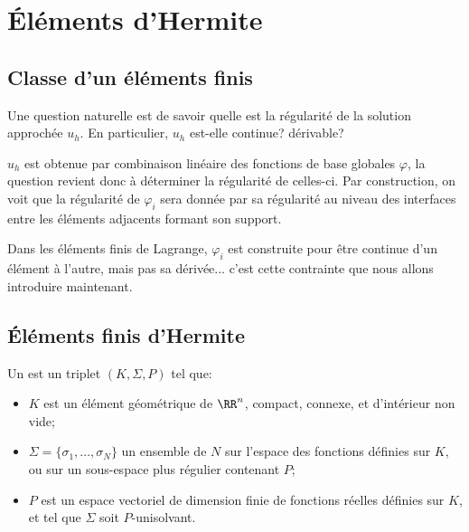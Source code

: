 \medskip
\section{Éléments d'Hermite}

\medskip
\subsection{Classe d'un éléments finis}

Une question naturelle est de savoir quelle est la régularité de la solution approchée
$u_h$. En particulier, $u_h$ est-elle continue? dérivable?

$u_h$ est obtenue par combinaison linéaire des fonctions de base globales
$\varphi$, la question revient donc à déterminer la régularité de celles-ci.
Par construction, on voit que la régularité de $\varphi_i$ sera donnée par sa
régularité au niveau des interfaces entre les éléments adjacents formant
son support.

Dans les éléments finis de Lagrange, $\varphi_i$ est construite pour être continue
d'un élément à l'autre, mais pas sa dérivée... c'est cette contrainte que
nous allons introduire maintenant.


\medskip
\subsection{Éléments finis d'Hermite}

\begin{definition}
Un  est un
triplet $(K, \Sigma, P)$ tel que:
\begin{itemize}
\item $K$ est un élément géométrique de $\RR^n$, compact, connexe, et d'intérieur
	non vide;
\item $\Sigma=\{\sigma_1,\ldots, \sigma_N\}$ un ensemble de $N$ 
	sur l'espace des fonctions définies sur $K$, ou sur un sous-espace plus régulier contenant $P$;
\item $P$ est un espace vectoriel de dimension finie de fonctions réelles définies sur $K$, et tel
	que $\Sigma$ soit $P$-unisolvant.
\end{itemize}
\end{definition}

